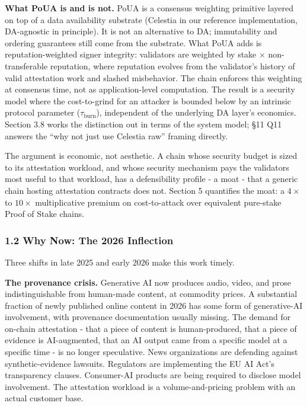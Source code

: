 \documentclass[
  11pt,
]{article}
\begin{document}
\textbf{What PoUA is and is not.} PoUA is a consensus weighting
primitive layered on top of a data availability substrate (Celestia in
our reference implementation, DA-agnostic in principle). It is not an
alternative to DA; immutability and ordering guarantees still come from
the substrate. What PoUA adds is reputation-weighted signer integrity:
validators are weighted by stake \(\times\) non-transferable reputation,
where reputation evolves from the validator's history of valid
attestation work and slashed misbehavior. The chain enforces this
weighting at consensus time, not as application-level computation. The
result is a security model where the cost-to-grind for an attacker is
bounded below by an intrinsic protocol parameter
(\(\tau_{\text{burn}}\)), independent of the underlying DA layer's
economics. Section 3.8 works the distinction out in terms of the system
model; §11 Q11 answers the ``why not just use Celestia raw'' framing
directly.

The argument is economic, not aesthetic. A chain whose security budget
is sized to its attestation workload, and whose security mechanism pays
the validators most useful to that workload, has a defensibility profile
- a moat - that a generic chain hosting attestation contracts does not.
Section 5 quantifies the moat: a \(4\times\) to \(10\times\)
multiplicative premium on cost-to-attack over equivalent pure-stake
Proof of Stake chains.

\subsubsection{1.2 Why Now: The 2026
Inflection}\label{why-now-the-2026-inflection}

Three shifts in late 2025 and early 2026 make this work timely.

\textbf{The provenance crisis.} Generative AI now produces audio, video,
and prose indistinguishable from human-made content, at commodity
prices. A substantial fraction of newly published online content in 2026
has some form of generative-AI involvement, with provenance
documentation usually missing. The demand for on-chain attestation -
that a piece of content is human-produced, that a piece of evidence is
AI-augmented, that an AI output came from a specific model at a specific
time - is no longer speculative. News organizations are defending
against synthetic-evidence lawsuits. Regulators are implementing the EU
AI Act's transparency clauses. Consumer-AI products are being required
to disclose model involvement. The attestation workload is a
volume-and-pricing problem with an actual customer base.
\end{document}
